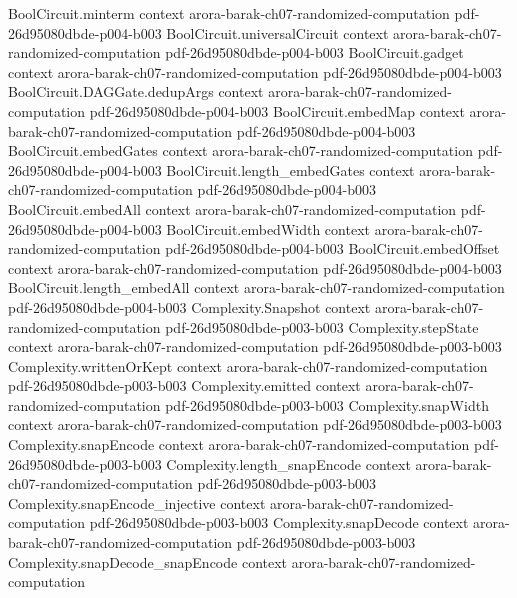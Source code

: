 \begin{theorem}
\proofstep
  {BoolCircuit.minterm}
  {context}
  {arora-barak-ch07-randomized-computation}
  {pdf-26d95080dbde-p004-b003}
\proofstep
  {BoolCircuit.universalCircuit}
  {context}
  {arora-barak-ch07-randomized-computation}
  {pdf-26d95080dbde-p004-b003}
\proofstep
  {BoolCircuit.gadget}
  {context}
  {arora-barak-ch07-randomized-computation}
  {pdf-26d95080dbde-p004-b003}
\proofstep
  {BoolCircuit.DAGGate.dedupArgs}
  {context}
  {arora-barak-ch07-randomized-computation}
  {pdf-26d95080dbde-p004-b003}
\proofstep
  {BoolCircuit.embedMap}
  {context}
  {arora-barak-ch07-randomized-computation}
  {pdf-26d95080dbde-p004-b003}
\proofstep
  {BoolCircuit.embedGates}
  {context}
  {arora-barak-ch07-randomized-computation}
  {pdf-26d95080dbde-p004-b003}
\proofstep
  {BoolCircuit.length_embedGates}
  {context}
  {arora-barak-ch07-randomized-computation}
  {pdf-26d95080dbde-p004-b003}
\proofstep
  {BoolCircuit.embedAll}
  {context}
  {arora-barak-ch07-randomized-computation}
  {pdf-26d95080dbde-p004-b003}
\proofstep
  {BoolCircuit.embedWidth}
  {context}
  {arora-barak-ch07-randomized-computation}
  {pdf-26d95080dbde-p004-b003}
\proofstep
  {BoolCircuit.embedOffset}
  {context}
  {arora-barak-ch07-randomized-computation}
  {pdf-26d95080dbde-p004-b003}
\proofstep
  {BoolCircuit.length_embedAll}
  {context}
  {arora-barak-ch07-randomized-computation}
  {pdf-26d95080dbde-p004-b003}
\proofstep
  {Complexity.Snapshot}
  {context}
  {arora-barak-ch07-randomized-computation}
  {pdf-26d95080dbde-p003-b003}
\proofstep
  {Complexity.stepState}
  {context}
  {arora-barak-ch07-randomized-computation}
  {pdf-26d95080dbde-p003-b003}
\proofstep
  {Complexity.writtenOrKept}
  {context}
  {arora-barak-ch07-randomized-computation}
  {pdf-26d95080dbde-p003-b003}
\proofstep
  {Complexity.emitted}
  {context}
  {arora-barak-ch07-randomized-computation}
  {pdf-26d95080dbde-p003-b003}
\proofstep
  {Complexity.snapWidth}
  {context}
  {arora-barak-ch07-randomized-computation}
  {pdf-26d95080dbde-p003-b003}
\proofstep
  {Complexity.snapEncode}
  {context}
  {arora-barak-ch07-randomized-computation}
  {pdf-26d95080dbde-p003-b003}
\proofstep
  {Complexity.length_snapEncode}
  {context}
  {arora-barak-ch07-randomized-computation}
  {pdf-26d95080dbde-p003-b003}
\proofstep
  {Complexity.snapEncode_injective}
  {context}
  {arora-barak-ch07-randomized-computation}
  {pdf-26d95080dbde-p003-b003}
\proofstep
  {Complexity.snapDecode}
  {context}
  {arora-barak-ch07-randomized-computation}
  {pdf-26d95080dbde-p003-b003}
\proofstep
  {Complexity.snapDecode_snapEncode}
  {context}
  {arora-barak-ch07-randomized-computation}

\end{theorem}
